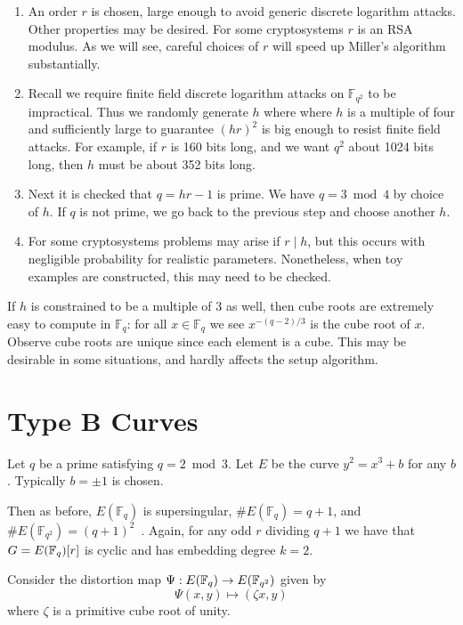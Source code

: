 \begin{enumerate}
\item
An order $r$ is chosen, large enough to avoid generic discrete logarithm
attacks. Other properties may be desired. For some cryptosystems $r$ is
an RSA modulus. As we will see, careful choices of $r$ will speed up Miller's
algorithm substantially.
\item
Recall we require finite field discrete logarithm attacks on $\mathbb{F}_{q^2}$
to be impractical. Thus we randomly generate $h$ where
where $h$ is a multiple of four and sufficiently large to guarantee $(hr)^2$
is big enough to resist
finite field attacks. For example, if $r$ is 160 bits long, and we want
$q^2$ about 1024 bits long, then $h$ must be about 352 bits long.
\item
Next it is checked that $q = h r - 1$ is prime. We have $q = 3 \bmod 4$
by choice of $h$.
If $q$ is not prime, we go back to the previous step and choose another
$h$.
\item
For some cryptosystems problems may arise if $r \mid h$, but this occurs
with negligible probability for realistic parameters. Nonetheless, when toy
examples are constructed, this may need to be checked.
\end{enumerate}

If $h$ is constrained to be a multiple of $3$ as well, then cube roots are
extremely easy to compute in $\mathbb{F}_{q}$:
for all $x \in \mathbb{F}_q$ we see $x^{-(q-2)/3}$ is the cube root of $x$.
Observe cube roots are unique since each element is a cube.
This may be desirable in some situations, and hardly affects the setup
algorithm.

\section {\label{sec:typeb}Type B Curves}

Let $q$ be a prime satisfying $q = 2 \bmod 3$.
Let $E$ be the curve $y^2 = x^3 + b$ for any $b$. Typically $b=\pm1$ is
chosen.

Then as before,
$E(\mathbb{F}_q)$ is supersingular,
$\#E(\mathbb{F}_q) = q+1$, and
$\#E(\mathbb{F}_{q^2}) = (q+1)^2$~\cite[\S 3.2]{fst}.
Again, for any odd $r$ dividing $q + 1$ we have that
$G = E(\mathbb{F}_q)[r]$ is cyclic and has embedding degree $k = 2$.

Consider the distortion map $\Psi:E(\mathbb{F}_q)\rightarrow E(\mathbb{F}_{q^2})$ given by
\[ \Psi(x, y) \mapsto (\zeta x, y) \]
where $\zeta$ is a primitive cube root of unity.


